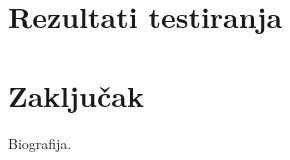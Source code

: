 \documentclass[12pt,oneside]{memoir}
\begin{document}
\chapter{Rezultati testiranja}

\chapter{Zaključak}

\literatura

\backmatter

\begin{biografija}
	Biografija.
\end{biografija}
\end{document}
